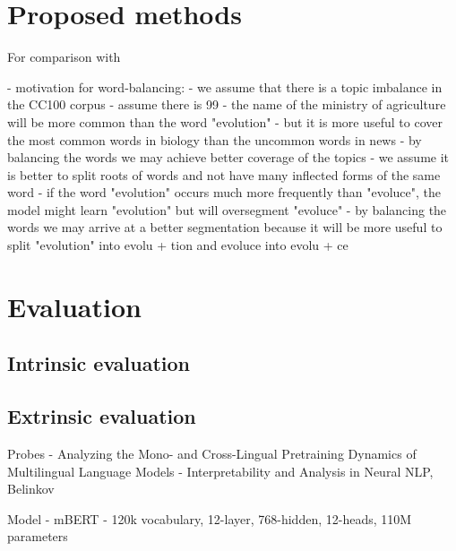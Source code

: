 
\section{Proposed methods}

For comparison with 

- motivation for word-balancing:
    - we assume that there is a topic imbalance in the CC100 corpus
        - assume there is 99%
        - the name of the ministry of agriculture will be more common than the word "evolution"
            - but it is more useful to cover the most common words in biology than the uncommon words in news
        - by balancing the words we may achieve better coverage of the topics
    - we assume it is better to split roots of words and not have many inflected forms of the same word
        - if the word "evolution" occurs much more frequently than "evoluce", the model might learn "evolution" but will oversegment "evoluce"
        - by balancing the words we may arrive at a better segmentation because it will be more useful to split "evolution" into evolu + tion and evoluce into evolu + ce

\section{Evaluation}

\subsection{Intrinsic evaluation}

\subsection{Extrinsic evaluation}


Probes
- Analyzing the Mono- and Cross-Lingual Pretraining Dynamics of Multilingual Language Models
- Interpretability and Analysis in Neural NLP, Belinkov

Model
- mBERT - 120k vocabulary, 12-layer, 768-hidden, 12-heads, 110M parameters